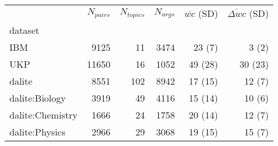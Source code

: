 \begin{tabular}{lrrrrr}
\toprule
{} &  $N_{pairs}$ &  $N_{topics}$ &  $N_{args}$ & $\overline{wc}$ (SD) & 
$\overline{\Delta wc}$ (SD) \\
dataset          &          &           &         &              &                   \\
\midrule
IBM              &     9125 &        11 &    3474 &       23 (7) &             3 (2) \\
UKP              &    11650 &        16 &    1052 &      49 (28) &           30 (23) \\
dalite           &     8551 &       102 &    8942 &      17 (15) &            12 (7) \\
dalite:Biology   &     3919 &        49 &    4116 &      15 (14) &            10 (6) \\
dalite:Chemistry &     1666 &        24 &    1758 &      20 (14) &            12 (7) \\
dalite:Physics   &     2966 &        29 &    3068 &      19 (15) &            15 (7) \\
\bottomrule
\end{tabular}
